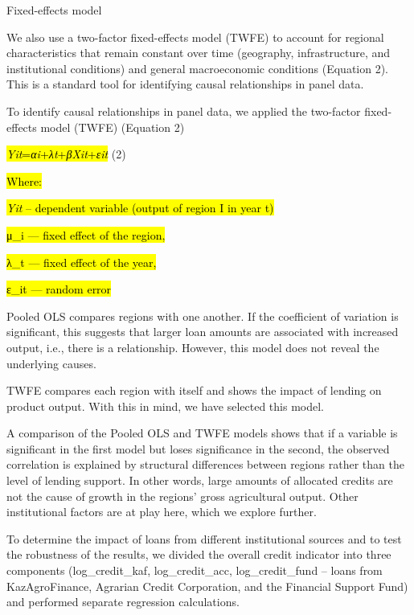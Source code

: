 \documentclass[
]{article}
\begin{document}
Fixed-effects model

We also use a two-factor fixed-effects model (TWFE) to account for
regional characteristics that remain constant over time (geography,
infrastructure, and institutional conditions) and general macroeconomic
conditions (Equation 2). This is a standard tool for identifying causal
relationships in panel data.

To identify causal relationships in panel data, we applied the
two-factor fixed-effects model (TWFE) (Equation 2)

\hl{\emph{Yit}\hspace{0pt}=\emph{αi}\hspace{0pt}+\emph{λt}\hspace{0pt}+\emph{βXit}\hspace{0pt}+\emph{εit}}\hspace{0pt}
(2)

\hl{Where:}

\hl{\emph{Yit}\hspace{0pt} -- dependent variable (output of region I in
year t)}

\hl{μ\_i --- fixed effect of the region,}

\hl{λ\_t --- fixed effect of the year,}

\hl{ε\_it --- random error}

Pooled OLS compares regions with one another. If the coefficient of
variation is significant, this suggests that larger loan amounts are
associated with increased output, i.e., there is a relationship.
However, this model does not reveal the underlying causes.

TWFE compares each region with itself and shows the impact of lending on
product output. With this in mind, we have selected this model.

A comparison of the Pooled OLS and TWFE models shows that if a variable
is significant in the first model but loses significance in the second,
the observed correlation is explained by structural differences between
regions rather than the level of lending support. In other words, large
amounts of allocated credits are not the cause of growth in the regions'
gross agricultural output. Other institutional factors are at play here,
which we explore further.

To determine the impact of loans from different institutional sources
and to test the robustness of the results, we divided the overall credit
indicator into three components (log\_credit\_kaf, log\_credit\_acc,
log\_credit\_fund -- loans from KazAgroFinance, Agrarian Credit
Corporation, and the Financial Support Fund) and performed separate
regression calculations.
\end{document}
